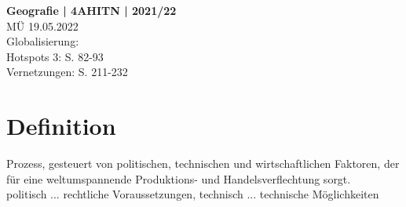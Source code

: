 \documentclass[a4paper, ngerman]{article}
\begin{document}
\begin{framed}

    \begin{center}
        \textbf{Geografie | 4AHITN | 2021/22} \\
        MÜ  19.05.2022\\
        Globalisierung: \\
        Hotspots 3: S. 82-93 \\
        Vernetzungen: S. 211-232
    \end{center}

\end{framed}

\section{Definition}
Prozess, gesteuert von politischen, technischen und wirtschaftlichen
Faktoren, der für eine weltumspannende Produktions- und Handelsverflechtung sorgt. \\
politisch ... rechtliche Voraussetzungen,
technisch ... technische Möglichkeiten
\end{document}

